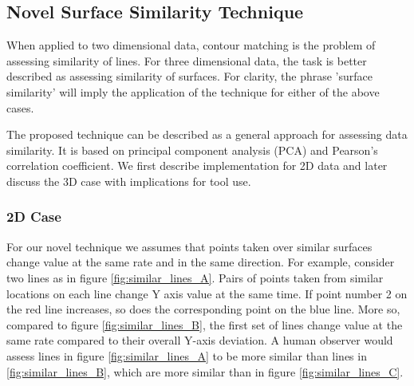 \documentclass[
    floatsintext
]{article}
\begin{document}
\pagebreak[0]
\subsection{Novel Surface Similarity Technique}
When applied to two dimensional data, contour matching is the problem of assessing similarity of lines. 
For three dimensional data, the task is better described as assessing similarity of surfaces.
For clarity, the phrase 'surface similarity' will imply the application of the technique for either of the above cases.  

The proposed technique can be described as a general approach for assessing data similarity. 
It is based on principal component analysis (PCA) and Pearson's correlation coefficient. 
We first describe implementation for 2D data and later discuss the 3D case with implications for tool use.  

\subsubsection{2D Case}
For our novel technique we assumes that points taken over similar surfaces change value at the same rate and in the same direction. 
For example, consider two lines as in figure \ref{fig:similar_lines_A}. Pairs of points taken from similar locations on each line change Y axis value at the same time. 
If point number 2 on the red line increases, so does the corresponding point on the blue line.   
More so, compared to figure \ref{fig:similar_lines_B}, the first set of lines change value at the same rate compared to their overall Y-axis deviation.
A human observer would assess lines in figure \ref{fig:similar_lines_A} to be more similar than lines in \ref{fig:similar_lines_B},
which are more similar than in figure \ref{fig:similar_lines_C}.
\end{document}
